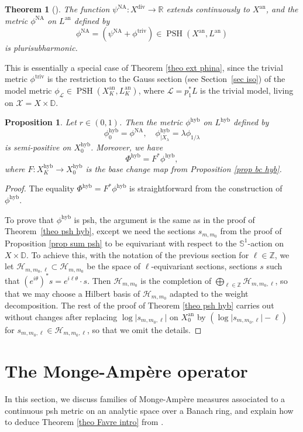 \documentclass[JEP,XML,SOM,Unicode,published]{cedram}
\newtheorem{theo}[equation]{Theorem}
\newtheorem{prop}[equation]{Proposition}
\theoremstyle{definition}
\newcommand \D {\mathbb{D}}
\newcommand \R{\mathbb R}
\newcommand \bS {\mathbb S}
\newcommand \Z{\mathbb Z}
\newcommand \Ld {\mathscr {L}}
\newcommand \X {\mathscr{X}}
\newcommand{\an}{\mathrm{an}}
\newcommand{\hyb}{\mathrm{hyb}}
\DeclareMathOperator{\NA}{NA}
\DeclareMathOperator{\PSH}{PSH}
\DeclareMathOperator{\triv}{triv}
\DeclareMathOperator{\xdiv}{div}
\begin{document}
\begin{theo}[{\cite[Th.\,6.2]{BBJ}}] The function $\psi^{\NA}: X^{\xdiv} \to \R$ extends continuously to $X^{\an}$, and the metric $\phi^{\NA}$ on $L^{\an}$ defined by\vspace*{-3pt}
\[
\phi^{\NA} = (\psi^{\NA} + \phi^{\triv}) \in \PSH(X^{\an}, L^{\an})
\]
is plurisubharmonic.
\end{theo}
This is essentially a special case of Theorem \ref{theo ext phina}, since the trivial metric $\phi^{\triv}$ is the restriction to the Gauss section (see Section~\ref{sec iso}) of the model metric $\phi_{\Ld} \in \PSH(X_K^{\an}, L_K^{\an})$, where $\Ld = p_1^*L$ is the trivial model, living on $\X = X \times \D$.
\begin{prop} Let $r \in (0,1)$. Then the metric $\phi^{\hyb}$ on $L^{\hyb}$ defined by
\[
\phi^{\hyb}_0 = \phi^{\NA},\quad\phi^{\hyb}_{| X_{\lambda}} = \lambda \phi_{1/\lambda}
\]
is semi-positive on $X^{\hyb}_0$. Moreover, we have
\[
\Phi^{\hyb} = F^* \phi^{\hyb},
\]
where $F: X^{\hyb}_K \to X^{\hyb}_0$ is the base change map from Proposition \ref{prop bc hyb}.
\end{prop}
\begin{proof} The equality $\Phi^{\hyb} = F^* \phi^{\hyb}$ is straightforward from the construction of~$\phi^{\hyb}$.

To prove that $\phi^{\hyb}$ is psh, the argument is the same as in the proof of Theorem~\ref{theo psh hyb}, except we need the sections $s_{m, m_0}$ from the proof of Proposition \ref{prop sum psh} to be equivariant with respect to the $\bS^1$-action on $X \times \D$. To achieve this, with the notation of the previous section for $\ell \in \Z$, we let $\mathscr{H}_{m, m_0, \ell}\subset \mathscr{H}_{m, m_0}$ be the space of $\ell$-equivariant sections, \ie sections $s$ such that $(e^{i\theta})^*s = e^{i \ell \theta} \cdot s$. Then $\mathscr{H}_{m, m_0}$ is the completion of $\bigoplus_{\ell \in \Z} \mathscr{H}_{m, m_0, \ell}$, so that we may choose a Hilbert basis of $\mathscr{H}_{m, m_0}$ adapted to the weight decomposition. The rest of the proof of Theorem \ref{theo psh hyb} carries out without changes after replacing $\log \lvert s_{m, m_0, \ell} \rvert$ on $X^{\an}_0$ by $(\log \lvert s_{m, m_0, \ell} \rvert -\ell)$ for $s_{m, m_0, \ell} \in \mathscr{H}_{m, m_0, \ell}$, so that we omit the details.
\end{proof}
\section{The Monge-Ampère operator}
\label{sec MA}
In this section, we discuss families of Monge-Ampère measures associated to a continuous psh metric on an analytic space over a Banach ring, and explain how to deduce Theorem \ref{theo Favre intro} from \cite{Fav}.
\end{document}
